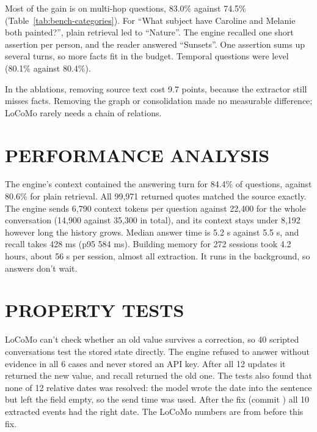 


Most of the gain is on multi-hop questions, 83.0\% against 74.5\%
(Table~\ref{tab:bench-categories}). For ``What subject have Caroline and Melanie both
painted?'', plain retrieval led to ``Nature''. The engine recalled one short assertion per
person, and the reader answered ``Sunsets''. One assertion sums up several turns, so more facts
fit in the budget. Temporal questions were level (80.1\% against 80.4\%).

In the ablations, removing source text cost 9.7 points, because the extractor still misses
facts. Removing the graph or consolidation made no measurable difference; LoCoMo rarely needs
a chain of relations.

\section{\uppercase{Performance Analysis}}
\label{sec:performance}
The engine's context contained the answering turn for 84.4\% of questions, against 80.6\% for
plain retrieval. All 99,971 returned quotes matched the source exactly. The engine sends 6,790
context tokens per question against 22,400 for the whole conversation (14,900 against 35,300
in total), and its context stays under 8,192 however long the history grows. Median answer
time is 5.2 s against 5.5 s, and recall takes 428 ms (p95 584 ms). Building memory for 272
sessions took 4.2 hours, about 56 s per session, almost all extraction. It runs in the
background, so answers don't wait.

\section{\uppercase{Property Tests}}
\label{sec:properties}
LoCoMo can't check whether an old value survives a correction, so 40 scripted conversations
test the stored state directly. The engine refused to answer without evidence in all 6 cases
and never stored an API key. After all 12 updates it returned the new value, and 
recall returned the old one. The tests also found that none of 12 relative dates was resolved:
the model wrote the date into the sentence but left the field empty, so the send time was used.
After the fix (commit ) all 10 extracted events had the right date. The LoCoMo
numbers are from before this fix.


